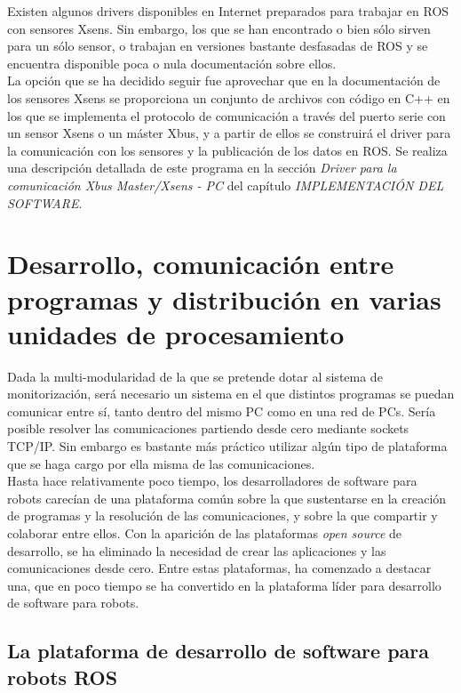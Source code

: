\documentclass[12pt, a4paper]{report}
\begin{document}
Existen algunos drivers disponibles en Internet preparados para trabajar en ROS con sensores Xsens. Sin embargo, los que se han encontrado o bien sólo sirven para un sólo sensor, o trabajan en versiones bastante desfasadas de ROS y se encuentra disponible poca o nula documentación sobre ellos. \\

La opción que se ha decidido seguir fue aprovechar que en la documentación de los sensores Xsens se proporciona un conjunto de archivos con código en C++ en los que se implementa el protocolo de comunicación a través del puerto serie con un sensor Xsens o un máster Xbus, y a partir de ellos se construirá el driver para la comunicación con los sensores y la publicación de los datos en ROS. Se realiza una descripción detallada de este programa en la sección \textit{Driver para la comunicación Xbus Master/Xsens - PC} del capítulo \textit{IMPLEMENTACIÓN DEL SOFTWARE}. 

\section{Desarrollo, comunicación entre programas y distribución en varias unidades de procesamiento}

Dada la multi-modularidad de la que se pretende dotar al sistema de monitorización, será necesario un sistema en el que distintos programas se puedan comunicar entre sí, tanto dentro del mismo PC como en una red de PCs. Sería posible resolver las comunicaciones partiendo desde cero mediante sockets TCP/IP. Sin embargo es bastante más práctico utilizar algún tipo de plataforma que se haga cargo por ella misma de las comunicaciones. \\

Hasta hace relativamente poco tiempo, los desarrolladores de software para robots carecían de una plataforma común sobre la que sustentarse en la creación de programas y la resolución de las comunicaciones, y sobre la que compartir y colaborar entre ellos. Con la aparición de las plataformas \textit{open source} de desarrollo, se ha eliminado la necesidad de crear las aplicaciones y las comunicaciones desde cero. Entre estas plataformas, ha comenzado a destacar una, que en poco tiempo se ha convertido en la plataforma líder para desarrollo de software para robots. \\

\subsection{La plataforma de desarrollo de software para robots ROS}
\end{document}
